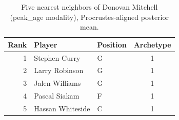 \begin{table}[htbp]
  \centering\small
  \begin{tabular}{rllc}
    \toprule
    Rank & Player & Position & Archetype \\
    \midrule
    1 & Stephen Curry & G & 1 \\
    2 & Larry Robinson & G & 1 \\
    3 & Jalen Williams & G & 1 \\
    4 & Pascal Siakam & F & 1 \\
    5 & Hassan Whiteside & C & 1 \\
    \bottomrule
  \end{tabular}
  \caption{Five nearest neighbors of Donovan Mitchell (peak_age modality), Procrustes-aligned posterior mean.}
  \label{tab:Donovan_Mitchell_neighbors_peak_age}
\end{table}

